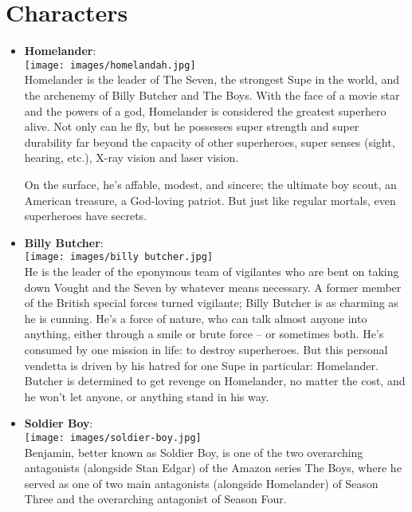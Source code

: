 \documentclass[12pt]{article}
\begin{document}
\section{Characters}
\begin{itemize}

    \item \flushleft \textbf{Homelander}:  \\
    \centering
    \texttt{[image: images/homelandah.jpg]} \\
    \flushleft
     Homelander is the leader of The Seven, the strongest Supe in the world, and the archenemy of Billy Butcher and The Boys. With the face of a movie star and the powers of a god, Homelander is considered the greatest superhero alive. Not only can he fly, but he possesses super strength and super durability far beyond the capacity of other superheroes, super senses (sight, hearing, etc.), X-ray vision and laser vision.

    On the surface, he's affable, modest, and sincere; the ultimate boy scout, an American treasure, a God-loving patriot. But just like regular mortals, even superheroes have secrets.
\newpage
    \item \flushleft \textbf{Billy Butcher}:  \\
    \centering
    \texttt{[image: images/billy butcher.jpg]} \\
    \flushleft
    He is the leader of the eponymous team of vigilantes who are bent on taking down Vought and the Seven by whatever means necessary. A former member of the British special forces turned vigilante; Billy Butcher is as charming as he is cunning. He's a force of nature, who can talk almost anyone into anything, either through a smile or brute force – or sometimes both. He's consumed by one mission in life: to destroy superheroes. But this personal vendetta is driven by his hatred for one Supe in particular: Homelander. Butcher is determined to get revenge on Homelander, no matter the cost, and he won't let anyone, or anything stand in his way.
\newpage
    \item \flushleft \textbf{Soldier Boy}:  \\
    \centering
    \texttt{[image: images/soldier-boy.jpg]} \\
    \flushleft
    Benjamin, better known as Soldier Boy, is one of the two overarching antagonists (alongside Stan Edgar) of the Amazon series The Boys, where he served as one of two main antagonists (alongside Homelander) of Season Three and the overarching antagonist of Season Four.


\end{itemize}
\end{document}
